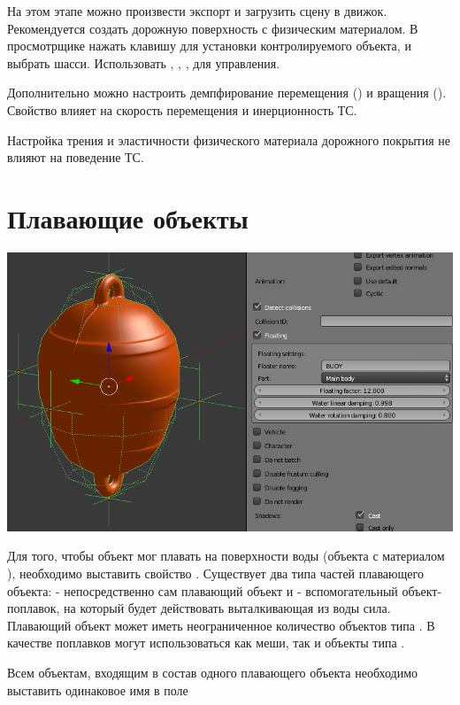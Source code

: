 \documentclass[a4paper,12pt,oneside]{sphinxmanual}
\begin{document}
На этом этапе можно произвести экспорт и загрузить сцену в движок. Рекомендуется создать дорожную поверхность с физическим материалом. В просмотрщике нажать клавишу  для установки контролируемого объекта, и выбрать шасси. Использовать , , ,  для управления.

Дополнительно можно настроить демпфирование  перемещения () и вращения (). Свойство влияет на скорость перемещения и инерционность ТС.

Настройка трения и эластичности физического материала дорожного покрытия не влияют на поведение ТС.


\section{Плавающие объекты}
\label{physics:id7}
\includegraphics[width=1.000\linewidth]{physics_floater.jpg}

\begin{DUlineblock}{0em}
\item[] 
\end{DUlineblock}

Для того, чтобы объект мог плавать на поверхности воды (объекта с материалом ), необходимо выставить свойство . Существует два типа частей плавающего объекта:  - непосредственно сам плавающий объект и  - вспомогательный объект-поплавок, на который будет действовать выталкивающая из воды сила. Плавающий объект может иметь неограниченное количество объектов типа . В качестве поплавков могут использоваться как меши, так и объекты типа .

Всем объектам, входящим в состав одного плавающего объекта необходимо выставить одинаковое имя в поле 
\end{document}
